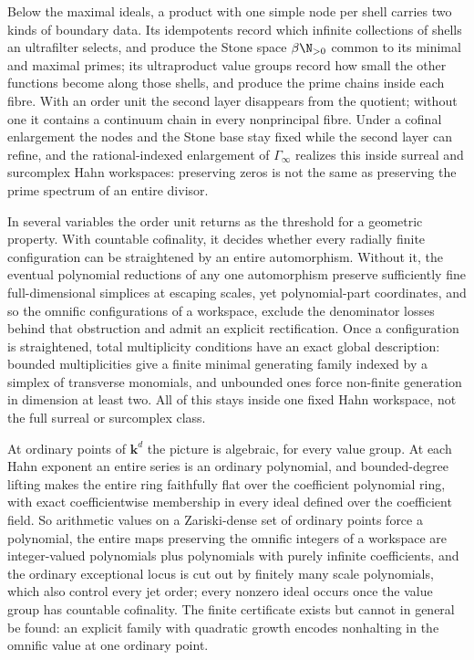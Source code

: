\documentclass[11pt]{article}
\theoremstyle{plain}
\theoremstyle{plain}
\theoremstyle{plain}
\theoremstyle{definition}
\theoremstyle{definition}
\theoremstyle{definition}
\theoremstyle{definition}
\theoremstyle{remark}
\newcommand{\kk}{\mathbf k}\newcommand{\PP}{\mathbb P}
\begin{document}
Below the maximal ideals, a product with one simple node per shell carries
two kinds of boundary data. Its idempotents record which infinite
collections of shells an ultrafilter selects, and produce the Stone space
$\beta\N_{>0}$ common to its minimal and maximal primes; its ultraproduct
value groups record how small the other functions become along those
shells, and produce the prime chains inside each fibre. With an order unit
the second layer disappears from the quotient; without one it contains a
continuum chain in every nonprincipal fibre. Under a cofinal enlargement the
nodes and the Stone base stay fixed while the second layer can refine, and
the rational-indexed enlargement of $\Gamma_\infty$ realizes this inside
surreal and surcomplex Hahn workspaces: preserving zeros is not the same as
preserving the prime spectrum of an entire divisor.

In several variables the order unit returns as the threshold for a geometric
property. With countable cofinality, it decides whether every radially finite
configuration can be straightened by an entire automorphism. Without it, the
eventual polynomial reductions of any one automorphism preserve sufficiently
fine full-dimensional simplices at escaping scales, yet polynomial-part
coordinates, and so the omnific configurations of a workspace, exclude the
denominator losses behind that obstruction and admit an explicit
rectification. Once a configuration is straightened, total multiplicity
conditions have an exact global description: bounded multiplicities give a
finite minimal generating family indexed by a simplex of transverse monomials,
and unbounded ones force non-finite generation in dimension at least two. All
of this stays inside one fixed Hahn workspace, not the full surreal or
surcomplex class.

At ordinary points of $\kk^d$ the picture is algebraic, for every value group.
At each Hahn exponent an entire series is an ordinary polynomial, and
bounded-degree lifting makes the entire ring faithfully flat over the
coefficient polynomial ring, with exact coefficientwise membership in every
ideal defined over the coefficient field. So arithmetic values on a
Zariski-dense set of ordinary points force a polynomial, the entire maps
preserving the omnific integers of a workspace are integer-valued polynomials
plus polynomials with purely infinite coefficients, and the ordinary
exceptional locus is cut out by finitely many scale polynomials, which also
control every jet order; every nonzero ideal occurs once the value group has
countable cofinality. The finite certificate exists but cannot in general be
found: an explicit family with quadratic growth encodes nonhalting in the
omnific value at one ordinary point.
\end{document}
